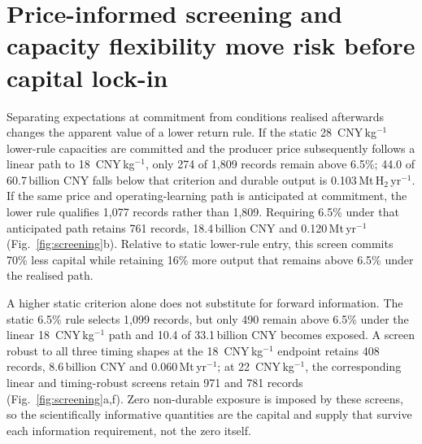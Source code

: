 \documentclass[lineno,pdflatex,sn-nature]{sn-jnl}
\newcommand{\cnykg}{CNY\,kg$^{-1}$}
\begin{document}
\section*{Price-informed screening and capacity flexibility move risk before capital lock-in}

Separating expectations at commitment from conditions realised afterwards changes the apparent value of a lower return rule. If the static 28~\cnykg{} lower-rule capacities are committed and the producer price subsequently follows a linear path to 18~\cnykg{}, only 274 of 1,809 records remain above 6.5\%; 44.0 of 60.7\,billion CNY falls below that criterion and durable output is 0.103\,Mt\,H$_2$\,yr$^{-1}$. If the same price and operating-learning path is anticipated at commitment, the lower rule qualifies 1,077 records rather than 1,809. Requiring 6.5\% under that anticipated path retains 761 records, 18.4\,billion CNY and 0.120\,Mt\,yr$^{-1}$ (Fig.~\ref{fig:screening}b). Relative to static lower-rule entry, this screen commits 70\% less capital while retaining 16\% more output that remains above 6.5\% under the realised path.

A higher static criterion alone does not substitute for forward information. The static 6.5\% rule selects 1,099 records, but only 490 remain above 6.5\% under the linear 18~\cnykg{} path and 10.4 of 33.1\,billion CNY becomes exposed. A screen robust to all three timing shapes at the 18~\cnykg{} endpoint retains 408 records, 8.6\,billion CNY and 0.060\,Mt\,yr$^{-1}$; at 22~\cnykg{}, the corresponding linear and timing-robust screens retain 971 and 781 records (Fig.~\ref{fig:screening}a,f). Zero non-durable exposure is imposed by these screens, so the scientifically informative quantities are the capital and supply that survive each information requirement, not the zero itself.
\end{document}
